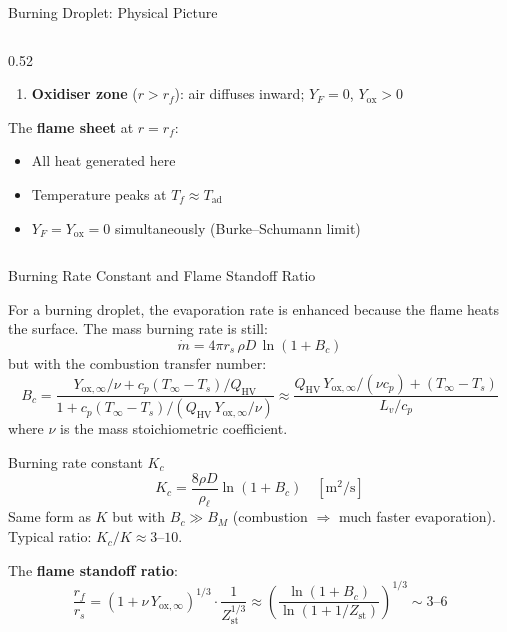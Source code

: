 \documentclass[12pt,aspectratio=169]{beamer}
\newcommand{\mdot}{\dot{m}}
\newcommand{\Tad}{T_{\text{ad}}}
\newcommand{\Ts}{T_s}
\newcommand{\Tinf}{T_\infty}
\newcommand{\rs}{r_s}
\newcommand{\rf}{r_f}
\newcommand{\BM}{B_M}
\newcommand{\Bc}{B_c}
\newcommand{\Zst}{Z_{\text{st}}}
\newcommand{\Kd}{K}
\newcommand{\Kc}{K_c}
\begin{document}
\begin{frame}{Burning Droplet: Physical Picture}
\begin{columns}
\begin{column}{0.52\textwidth}
\begin{enumerate}
        \item \textbf{Oxidiser zone} ($r > \rf$):
              air diffuses inward;
              $Y_F = 0$, $Y_{\text{ox}} > 0$
      \end{enumerate}
      \vspace{4pt}
      The \textbf{flame sheet} at $r = \rf$:
      \begin{itemize}
        \item All heat generated here
        \item Temperature peaks at $T_f \approx \Tad$
        \item $Y_F = Y_{\text{ox}} = 0$ simultaneously
              (Burke--Schumann limit)
      \end{itemize}
    \end{column}
  \end{columns}
\end{frame}

\begin{frame}{Burning Rate Constant and Flame Standoff Ratio}

  For a burning droplet, the evaporation rate is enhanced because
  the flame heats the surface.
  The mass burning rate is still:
  \[
    \mdot = 4\pi\rs\,\rho D\,\ln(1+\Bc)
  \]
  but with the \alert{combustion transfer number}:
  \[
    \Bc = \frac{Y_{\text{ox},\infty}/\nu + c_p(\Tinf - \Ts)/Q_{\text{HV}}}
              {1 + c_p(\Tinf - \Ts)/(Q_{\text{HV}}\,Y_{\text{ox},\infty}/\nu)}
    \approx \frac{Q_{\text{HV}}\,Y_{\text{ox},\infty}/(\nu c_p) + (\Tinf - \Ts)}
                 {L_v/c_p}
  \]
  where $\nu$ is the mass stoichiometric coefficient.

  \begin{block}{Burning rate constant $\Kc$}
    \[
      \Kc = \frac{8\rho D}{\rho_\ell}\ln(1+\Bc)
      \quad [\text{m}^2/\text{s}]
    \]
    Same form as $\Kd$ but with $\Bc \gg \BM$
    (combustion $\Rightarrow$ much faster evaporation).
    Typical ratio: $\Kc / \Kd \approx 3$--$10$.
  \end{block}

  \vspace{2pt}
  The \textbf{flame standoff ratio}:
  \[
    \frac{\rf}{\rs} = (1 + \nu\,Y_{\text{ox},\infty})^{1/3}
    \cdot \frac{1}{\Zst^{1/3}}
    \approx \left(\frac{\ln(1+\Bc)}{\ln(1+1/\Zst)}\right)^{1/3}
    \sim 3\text{--}6
  \]
\end{frame}
\end{document}
